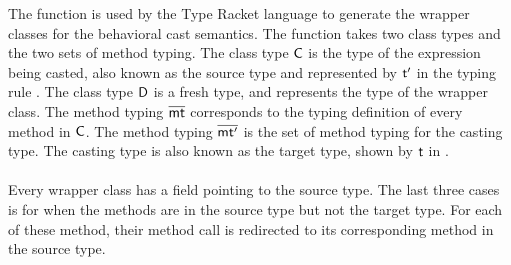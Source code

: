 \documentclass[acmlarge, anonymous, authordraft]{acmart}
\begin{document}
The  function is used by the Type Racket language to generate the wrapper classes
for the behavioral cast semantics. The  function takes two class types and the two
sets of method typing. The class type ${\sf{C}}$ is the type of the expression being casted, also known 
as the source type and represented by $\tp$ in the typing rule .
The class type ${\sf{D}}$ is a fresh type, and represents the type of the wrapper class.
The method typing $\overline{{\sf{mt}}}$ corresponds to the typing definition of every method in ${\sf{C}}$.
The method typing $\overline{{\sf{mt'}}}$ is the set of method typing for the casting type. The casting
type is also known as the target type, shown by $\t$ in . \\
 
 \\

Every wrapper class has a  field pointing to the source type.
The last three cases is for when the methods are in the source type but not the 
target type. For each of these method, their method call is redirected 
to its corresponding method in the source type.


\renewcommand{\bscast}[2]{\EM{\BehCast{#1}{{#2}}}}
\end{document}
